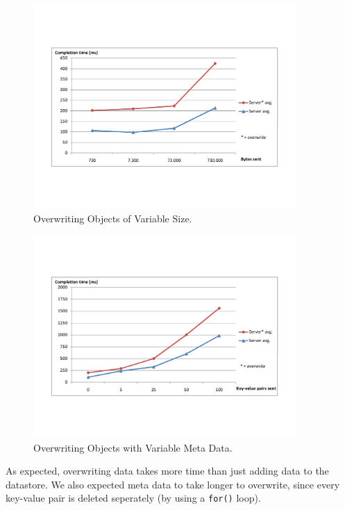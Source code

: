 \begin{figure} %
\begin{center}
\includegraphics[trim=5cm 4cm 5cm 5cm,width=10cm]{./figures/ovw_obj.pdf}
\caption{Overwriting Objects of Variable Size. \label{ovw-obj-size}}
\end{center}
\end{figure}

\begin{figure} %
\begin{center}
\includegraphics[trim=5cm 4cm 5cm 5cm,width=10cm]{./figures/ovw_md.pdf}
\caption{Overwriting Objects with Variable Meta Data. \label{ovw-md-size}}
\end{center}
\end{figure}

As expected, overwriting data takes more time than just adding data to the
datastore. We also expected meta data to take longer to overwrite, since every
key-value pair is deleted seperately (by using a \texttt{for()} loop). 

